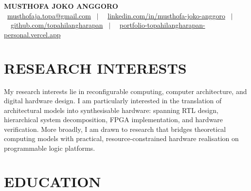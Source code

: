 \documentclass[10pt,a4paper]{article}
\newcommand{\contactline}[1]{\small #1}
\begin{document}
\begin{center}
    {\LARGE \textbf{MUSTHOFA JOKO ANGGORO}} \\[2pt]
    \contactline{
        \faEnvelope\ \href{mailto:musthofaja.topa@gmail.com}{musthofaja.topa@gmail.com} \ $|$ \ 
        \faLinkedin\ \href{https://www.linkedin.com/in/musthofa-joko-anggoro/}{linkedin.com/in/musthofa-joko-anggoro} \ $|$ \
        \faGithub\ \href{https://github.com/topahilangharapan}{github.com/topahilangharapan} \ $|$ \
        \faGlobe\ \href{https://portfolio-topahilangharapan-personal.vercel.app/}{portfolio-topahilangharapan-personal.vercel.app}
    }
\end{center}

\vspace{-10pt}

\section*{RESEARCH INTERESTS}
My research interests lie in reconfigurable computing, computer architecture, and digital hardware design. I am particularly interested in the translation of architectural models into synthesisable hardware: spanning RTL design, hierarchical system decomposition, FPGA implementation, and hardware verification. More broadly, I am drawn to research that bridges theoretical computing models with practical, resource-constrained hardware realisation on programmable logic platforms.

\section*{EDUCATION}
\end{document}

